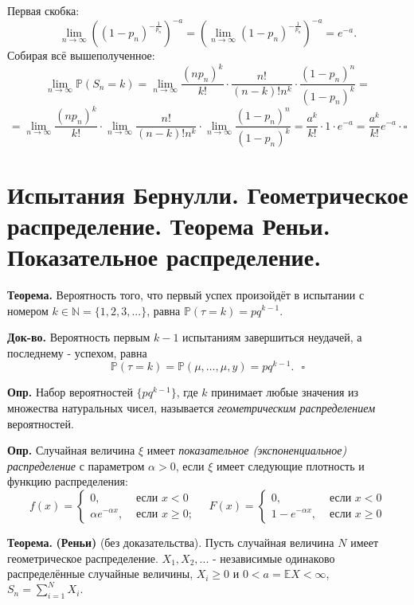 \documentclass[oneside,final,14pt]{extreport}
\newcommand\mydef{{\bf Опр.}}
\newcommand\myth{{\bf Теорема.}}
\newcommand\myqed{{\bf Док-во.}}
\newcommand\myprob[1]{{\mathbb{P}(#1)}}
\theoremstyle{definition}
\begin{document}
Первая скобка:
$$\lim _{n \to \infty}\left(\left(1-p_{n}\right)^{-\frac{1}{p_{n}}}\right)^{-a}=\left(\lim _{n \to \infty}\left(1-p_{n}\right)^{-\frac{1}{p_{n}}}\right)^{-a}=e^{-a}.$$
Собирая всё вышеполученное:
$$\lim _{n \to \infty} \mathbb{P}\left(S_{n}=k\right)=\lim _{n \to \infty} \frac{\left(n p_{n}\right)^{k}}{k !} \cdot \frac{n !}{(n-k) ! n^{k}} \cdot \frac{\left(1-p_{n}\right)^{n}}{\left(1-p_{n}\right)^{k}} = $$
$$=\lim _{n \to \infty} \frac{\left(n p_{n}\right)^{k}}{k !} \cdot \lim _{n \to \infty} \frac{n !}{(n-k) ! n^{k}} \cdot \lim _{n \to \infty} \frac{\left(1-p_{n}\right)^{n}}{\left(1-p_{n}\right)^{k}}=\frac{a^{k}}{k !} \cdot 1 \cdot e^{-a}=\frac{a^{k}}{k !} e^{-a} \cdot \square$$

\section {Испытания Бернулли. Геометрическое распределение. Теорема Реньи. Показательное распределение.}

\myth{} Вероятность того, что первый успех произойдёт в испытании с номером $k \in \mathbb{N} = \{1, 2, 3, ...\}$, равна $\myprob{\tau = k} = pq^{k-1}$.

\myqed{} Вероятность первым $k - 1$ испытаниям завершиться неудачей, а последнему - успехом, равна 
$$\mathbb{P}(\tau=k)=\mathbb{P}(\mu, \ldots, \mu, y)=p q^{k-1}. ~~~ \square$$

\mydef{} Набор вероятностей $\{p q^{k-1}\}$, где $k$ принимает любые значения из множества натуральных чисел, называется {\it геометрическим распределением} вероятностей. 

\mydef{} Случайная величина $\xi$ имеет {\it показательное (экспоненциальное) распределение} с параметром $\alpha > 0$, если $\xi$ имеет следующие плотность и функцию распределения:
$$f(x)=\left\{\begin{array}{cc}
0, & \text { если } x<0 \\
\alpha e^{-\alpha x}, & \text { если } x \geqslant 0 ;
\end{array} \quad F(x)=\left\{\begin{array}{cc}
0, & \text { если } x<0 \\
1-e^{-\alpha x}, & \text { если } x \geqslant 0
\end{array}\right.\right.$$

\myth{} \textbf{(Реньи)} (без доказательства). Пусть случайная величина $N$ имеет геометрическое распределение. $X_1, X_2, ...$ - независимые одинаково распределённые случайные величины, $X_i \geqslant 0$ и $0 < a = \mathbb{E}X < \infty$, $S_n = \sum\limits_{i=1}^N X_i.$
\end{document}
